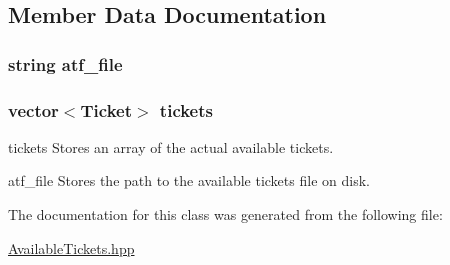\subsection{Member Data Documentation}
\hypertarget{class_available_tickets_ad677bc95025de980a4144bcf63e5b4ba}{
\subsubsection[{atf\-\_\-file}]{\setlength{\rightskip}{0pt plus 5cm}string atf\-\_\-file\hspace{0.3cm}{\ttfamily [private]}}}\label{class_available_tickets_ad677bc95025de980a4144bcf63e5b4ba}
\hypertarget{class_available_tickets_ad50ec5da3cb7e33f97d6ed07e362a50a}{
\subsubsection[{tickets}]{\setlength{\rightskip}{0pt plus 5cm}vector$<${\bf Ticket}$>$ tickets\hspace{0.3cm}{\ttfamily [private]}}}\label{class_available_tickets_ad50ec5da3cb7e33f97d6ed07e362a50a}


tickets Stores an array of the actual available tickets. 

atf\-\_\-file Stores the path to the available tickets file on disk. 

The documentation for this class was generated from the following file\-:\begin{DoxyCompactItemize}
\item 
\hyperlink{_available_tickets_8hpp}{Available\-Tickets.\-hpp}\end{DoxyCompactItemize}
